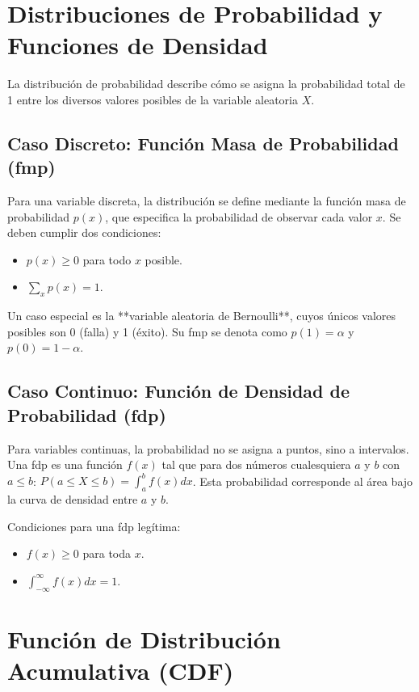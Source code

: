 \documentclass[a4paper]{article}
\begin{document}
\section{Distribuciones de Probabilidad y Funciones de Densidad}

La distribución de probabilidad describe cómo se asigna la probabilidad total de 1 entre los diversos valores posibles de la variable aleatoria $X$.

\subsection{Caso Discreto: Función Masa de Probabilidad (fmp)}

Para una variable discreta, la distribución se define mediante la función masa de probabilidad $p(x)$, que especifica la probabilidad de observar cada valor $x$.
Se deben cumplir dos condiciones:
\begin{itemize}
    \item $p(x) \geq 0$ para todo $x$ posible.
    \item $\sum_{x} p(x) = 1$.
\end{itemize}

Un caso especial es la **variable aleatoria de Bernoulli**, cuyos únicos valores posibles son 0 (falla) y 1 (éxito). Su fmp se denota como $p(1) = \alpha$ y $p(0) = 1 - \alpha$.

\subsection{Caso Continuo: Función de Densidad de Probabilidad (fdp)}

Para variables continuas, la probabilidad no se asigna a puntos, sino a intervalos. Una fdp es una función $f(x)$ tal que para dos números cualesquiera $a$ y $b$ con $a \leq b$:
$P(a \leq X \leq b) = \int_{a}^{b} f(x) dx$.
Esta probabilidad corresponde al área bajo la curva de densidad entre $a$ y $b$.

Condiciones para una fdp legítima:
\begin{itemize}
    \item $f(x) \geq 0$ para toda $x$.
    \item $\int_{-\infty}^{\infty} f(x) dx = 1$.
\end{itemize}

\section{Función de Distribución Acumulativa (CDF)}
\end{document}
